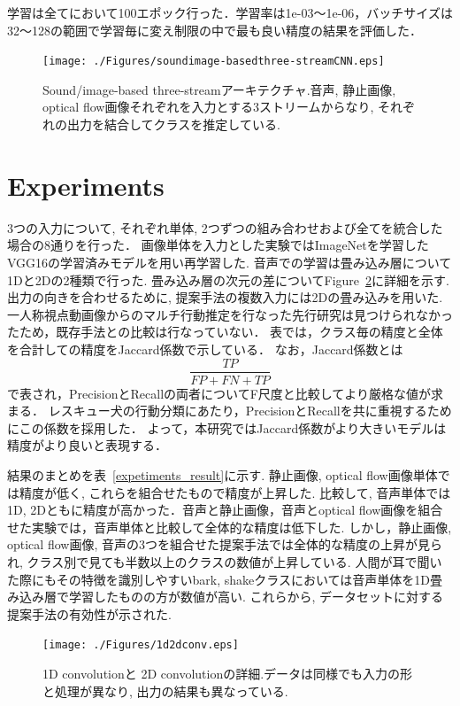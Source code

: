 \documentclass[MIRU,submit,english]{miru2019e}
\begin{document}
学習は全てにおいて100エポック行った．学習率は1e-03〜1e-06，バッチサイズは32〜128の範囲で学習毎に変え制限の中で最も良い精度の結果を評価した．

\begin{figure}[tb]
   \begin{center}
    \texttt{[image: ./Figures/soundimage-basedthree-streamCNN.eps]}
    \caption{Sound/image-based three-streamアーキテクチャ.音声, 静止画像, optical flow画像それぞれを入力とする3ストリームからなり, それぞれの出力を結合してクラスを推定している.}
    \label{sound3st}
   \end{center}
\end{figure}

\section{Experiments}

3つの入力について, それぞれ単体, 2つずつの組み合わせおよび全てを統合した場合の8通りを行った．%
画像単体を入力とした実験ではImageNetを学習したVGG16の学習済みモデルを用い再学習した.
音声での学習は畳み込み層について1Dと2Dの2種類で行った.
畳み込み層の次元の差についてFigure~\ref{1d2dconv}に詳細を示す.出力の向きを合わせるために, 提案手法の複数入力には2Dの畳み込みを用いた.
一人称視点動画像からのマルチ行動推定を行なった先行研究は見つけられなかったため，既存手法との比較は行なっていない．
表では，クラス毎の精度と全体を合計しての精度をJaccard係数で示している．
なお，Jaccard係数とは$$\frac{TP}{FP+FN+TP}$$で表され，PrecisionとRecallの両者についてF尺度と比較してより厳格な値が求まる．
レスキュー犬の行動分類にあたり，PrecisionとRecallを共に重視するためにこの係数を採用した．
よって，本研究ではJaccard係数がより大きいモデルは精度がより良いと表現する．

結果のまとめを表~\ref{expetiments_result}に示す.
静止画像, optical flow画像単体では精度が低く, これらを組合せたもので精度が上昇した.
比較して, 音声単体では1D, 2Dともに精度が高かった．音声と静止画像，音声とoptical flow画像を組合せた実験では，音声単体と比較して全体的な精度は低下した.
しかし，静止画像, optical flow画像, 音声の3つを組合せた提案手法では全体的な精度の上昇が見られ, クラス別で見ても半数以上のクラスの数値が上昇している.
人間が耳で聞いた際にもその特徴を識別しやすいbark, shakeクラスにおいては音声単体を1D畳み込み層で学習したものの方が数値が高い.
これらから, データセットに対する提案手法の有効性が示された.

\begin{figure}[tb]
   \begin{center}
    \texttt{[image: ./Figures/1d2dconv.eps]}
    \caption{1D convolutionと 2D convolutionの詳細.データは同様でも入力の形と処理が異なり, 出力の結果も異なっている.}
    \label{1d2dconv}
   \end{center}
\end{figure}
\end{document}
